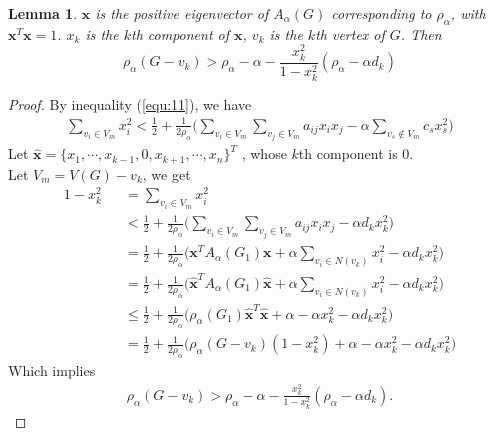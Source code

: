 \documentclass[amsthm]{elsart}
\newtheorem{lemma}{Lemma}[section]
\begin{document}
\begin{lemma} \label{lem:2}
$\textbf{x}$ is the positive eigenvector of $A_\alpha (G)$ corresponding to $\rho _\alpha$, with $\textbf{x}^T \textbf{x} = 1$. $x_k$ is the $k$th component of $\textbf{x}$, $v_k$ is  the $k$th vertex of $G$. Then
\begin{equation} \label{equ:13}
\rho _\alpha (G - v_k)
    > \rho _\alpha - \alpha - \frac{x_k^2}{1 - x_k^2} (\rho _\alpha - \alpha d_k)
\end{equation}
\end{lemma}

\begin{proof}
By inequality (\ref{equ:11}), we have
\begin{eqnarray*}
\sum \limits_{v_i \in V_m}^{} x_i^2
< \frac{1}{2} + \frac{1}{2 \rho_\alpha} \Big( \sum \limits_{v_i \in V_m}^{} \sum \limits_{v_j \in V_m}^{} a_{ij} x_i x_j - \alpha \sum \limits_{v_s \notin V_m}^{} c_s x_s^2 \Big)
\end{eqnarray*}
Let $\hat{\textbf{x}} = \{x_1, \cdots, x_{k-1}, 0, x_{k+1}, \cdots, x_n\}^T$ , whose $k$th component is 0. \\
Let $V_m = V(G) - v_k$,  we get
\begin{eqnarray*}
1 - x_k^2
&&= \sum \limits_{v_i \in V_m}^{} x_i^2
\\ &&< \frac{1}{2} + \frac{1}{2 \rho_\alpha} \Big( \sum \limits_{v_i \in V_m}^{} \sum \limits_{v_j \in V_m}^{} a_{ij} x_i x_j - \alpha d_k x_k^2 \Big)
\\ &&= \frac{1}{2} + \frac{1}{2 \rho_\alpha} \Big( \textbf{x}^T A_\alpha(G_1) \textbf{x} + \alpha \sum \limits_{v_i \in N(v_k)}^{} x_i^2 - \alpha d_k x_k^2 \Big)
\\ &&= \frac{1}{2} + \frac{1}{2 \rho_\alpha} \Big( \hat{\textbf{x}}^T A_\alpha(G_1) \hat{\textbf{x}} + \alpha \sum \limits_{v_i \in N(v_k)}^{} x_i^2 - \alpha d_k x_k^2 \Big)
\\ &&\leqslant \frac{1}{2} + \frac{1}{2 \rho_\alpha} \Big( \rho_\alpha (G_1) \hat{\textbf{x}}^T \hat{\textbf{x}} + \alpha - \alpha  x_k^2 - \alpha d_k x_k^2 \Big)
\\ &&= \frac{1}{2} + \frac{1}{2 \rho_\alpha} \Big( \rho_\alpha (G - v_k) (1 - x_k^2) + \alpha - \alpha  x_k^2 - \alpha d_k x_k^2 \Big)
\end{eqnarray*}
Which implies
\begin{eqnarray*}
  \rho_\alpha (G - v_k) > \rho_\alpha - \alpha - \frac{x_k^2}{1 - x_k^2} ( \rho_\alpha - \alpha d_k).
\end{eqnarray*}
\end{proof}
\end{document}
